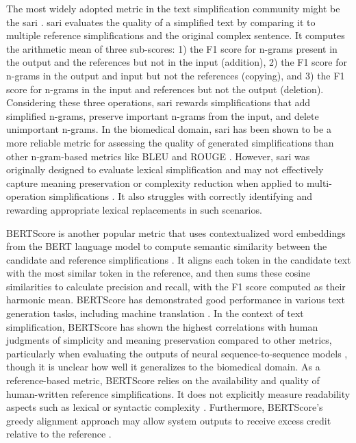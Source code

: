 The most widely adopted metric in the text simplification community might be the \gls{sari} \cite{xu-etal-2016-optimizing}. 
\gls{sari} evaluates the quality of a simplified text by comparing it to multiple reference simplifications and the original complex sentence. 
It computes the arithmetic mean of three sub-scores: 1) the F1 score for n-grams present in the output and the references but not in the input (addition), 2) the F1 score for n-grams in the output and input but not the references (copying), and 3) the F1 score for n-grams in the input and references but not the output (deletion). 
Considering these three operations, \gls{sari} rewards simplifications that add simplified n-grams, preserve important n-grams from the input, and delete unimportant n-grams. 
In the biomedical domain, \gls{sari} has been shown to be a more reliable metric for assessing the quality of generated simplifications than other n-gram-based metrics like BLEU and ROUGE \cite{li2024largelanguagemodelsbiomedical}. 
However, \gls{sari} was originally designed to evaluate lexical simplification and may not effectively capture meaning preservation or complexity reduction when applied to multi-operation simplifications \cite{alva-manchego-etal-2021-un}.
It also struggles with correctly identifying and rewarding appropriate lexical replacements in such scenarios.

BERTScore is another popular metric that uses contextualized word embeddings from the BERT language model to compute semantic similarity between the candidate and reference simplifications \cite{zhang2020bertscoreevaluatingtextgeneration}. 
It aligns each token in the candidate text with the most similar token in the reference, and then sums these cosine similarities to calculate precision and recall, with the F1 score computed as their harmonic mean. 
BERTScore has demonstrated good performance in various text generation tasks, including machine translation \cite{Vetrov2022ANA, Tang2024ImprovingBF}. 
In the context of text simplification, BERTScore has shown the highest correlations with human judgments of simplicity and meaning preservation compared to other metrics, particularly when evaluating the outputs of neural sequence-to-sequence models \cite{alva-manchego-etal-2021-un}, though it is unclear how well it generalizes to the biomedical domain. 
As a reference-based metric, BERTScore relies on the availability and quality of human-written reference simplifications. It does not explicitly measure readability aspects such as lexical or syntactic complexity \cite{li2024largelanguagemodelsbiomedical}. 
Furthermore, BERTScore's greedy alignment approach may allow system outputs to receive excess credit relative to the reference \cite{jin-gildea-2022-rewarding}.

